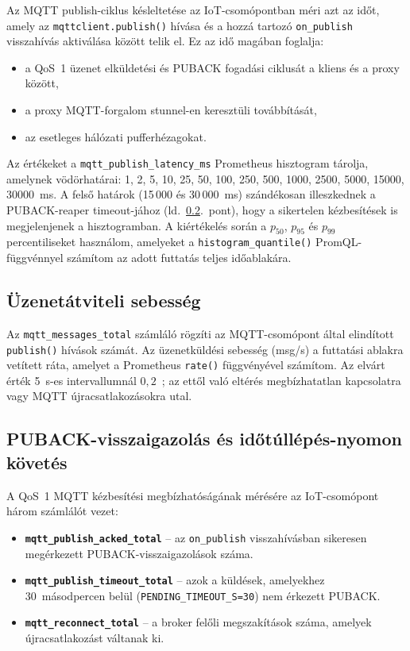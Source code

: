 Az MQTT publish-ciklus késleltetése az IoT-csomópontban méri azt az időt, amely az
\texttt{mqttclient.publish()} hívása és a hozzá tartozó \texttt{on\_publish} visszahívás
aktiválása között telik el. Ez az idő magában foglalja:
\begin{itemize}
    \item a QoS~1 üzenet elküldetési és PUBACK fogadási ciklusát a kliens és a proxy között,
    \item a proxy MQTT-forgalom stunnel-en keresztüli továbbítását,
    \item az esetleges hálózati pufferhézagokat.
\end{itemize}
Az értékeket a \texttt{mqtt\_publish\_latency\_ms} Prometheus hisztogram tárolja, amelynek
vödörhatárai: 1, 2, 5, 10, 25, 50, 100, 250, 500, 1000, 2500, 5000, 15000, 30000~ms.
A felső határok (15\,000 és 30\,000~ms) szándékosan illeszkednek a PUBACK-reaper
timeout-jához (ld.\ \ref{subsec:puback-tracking}.\ pont), hogy a sikertelen
kézbesítések is megjelenjenek a hisztogramban. A kiértékelés során a $p_{50}$, $p_{95}$
és $p_{99}$ percentiliseket használom, amelyeket a \texttt{histogram\_quantile()}
PromQL-függvénnyel számítom az adott futtatás teljes időablakára.

\subsection{Üzenetátviteli sebesség}

Az \texttt{mqtt\_messages\_total} számláló rögzíti az MQTT-csomópont által elindított
\texttt{publish()} hívások számát. Az üzenetküldési sebesség (msg/s) a futtatási ablakra
vetített ráta, amelyet a Prometheus \texttt{rate()} függvényével számítom. Az elvárt
érték 5~s-es intervallumnál $0{,}2$~; az ettől való eltérés megbízhatatlan
kapcsolatra vagy MQTT újracsatlakozásokra utal.

\subsection{PUBACK-visszaigazolás és időtúllépés-nyomon követés}
\label{subsec:puback-tracking}

A QoS~1 MQTT kézbesítési megbízhatóságának mérésére az IoT-csomópont három számlálót
vezet:

\begin{itemize}
    \item \textbf{\texttt{mqtt\_publish\_acked\_total}} -- az \texttt{on\_publish}
          visszahívásban sikeresen megérkezett PUBACK-visszaigazolások száma.
    \item \textbf{\texttt{mqtt\_publish\_timeout\_total}} -- azok a küldések, amelyekhez
          30~másodpercen belül (\texttt{PENDING\_TIMEOUT\_S=30}) nem érkezett PUBACK.
    \item \textbf{\texttt{mqtt\_reconnect\_total}} -- a broker felőli
          megszakítások száma, amelyek újracsatlakozást váltanak ki.
\end{itemize}

